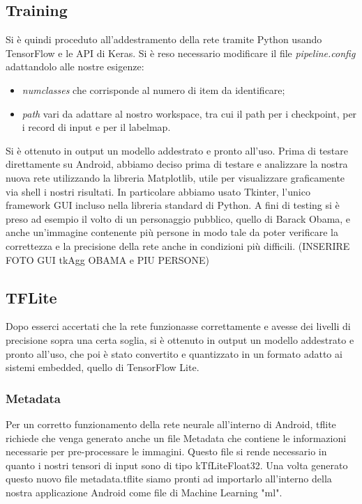 \documentclass[11pt]{article}
\begin{document}
\subsection{Training}
Si è quindi proceduto all’addestramento della rete tramite Python usando TensorFlow e le API di Keras. Si è reso necessario modificare il file \textit{pipeline.config} adattandolo alle nostre esigenze: 
\begin{itemize}
    \item \textit{numclasses} che corrisponde al numero di item da identificare;
    \item \textit{path} vari da adattare al nostro workspace, tra cui il path per i checkpoint, per i record di input e per il labelmap.
\end{itemize}

Si è ottenuto in output un modello addestrato e pronto all’uso. 
\newline \newline
Prima di testare direttamente su Android, abbiamo deciso prima di testare e analizzare la nostra nuova rete utilizzando la libreria Matplotlib, utile per visualizzare graficamente via shell i nostri risultati. In particolare abbiamo usato Tkinter, l'unico framework GUI incluso nella libreria standard di Python.
\newline
A fini di testing si è preso ad esempio il volto di un
personaggio pubblico, quello di Barack Obama, e anche un'immagine contenente più persone in modo tale da poter verificare la correttezza e la precisione della rete anche in condizioni più difficili. (INSERIRE FOTO GUI tkAgg OBAMA e PIU PERSONE)


\subsection{TFLite}
Dopo esserci accertati che la rete funzionasse correttamente e avesse dei livelli di precisione sopra una certa soglia, si è ottenuto in output un modello addestrato
e pronto all’uso, che poi è stato convertito e quantizzato in un formato adatto ai sistemi embedded, quello di TensorFlow Lite.
\subsubsection{Metadata}
Per un corretto funzionamento della rete neurale all'interno di Android, tflite richiede che venga generato anche un file Metadata che contiene le informazioni necessarie per pre-processare le immagini. Questo file si rende necessario in quanto i nostri tensori di input sono di tipo kTfLiteFloat32. 
\newline
Una volta generato questo nuovo file metadata.tflite siamo pronti ad importarlo all'interno della nostra applicazione Android come file di Machine Learning "ml".
\end{document}
